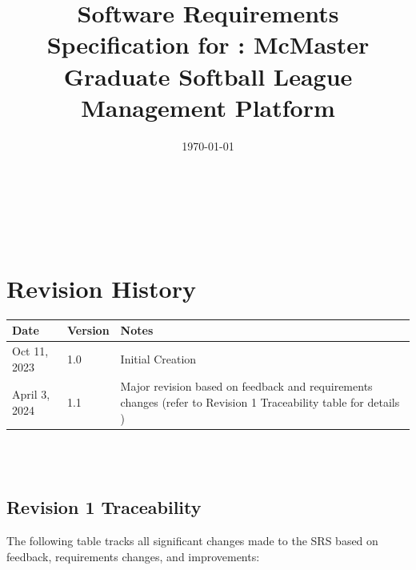 \documentclass[12pt, titlepage]{article}
\begin{document}
\title{Software Requirements Specification for \progname: McMaster Graduate Softball League Management Platform} 
\author{\authname}
\date{\today}
	
\maketitle

~\newpage


\tableofcontents

\listoftables

~\newpage

\section*{Revision History}

\begin{tabularx}{\textwidth}{p{3cm}p{2cm}X}
\toprule {\textbf{Date}} & {\textbf{Version}} & {\textbf{Notes}}\\
\midrule
Oct 11, 2023 & 1.0 & Initial Creation \\
April 3, 2024 & 1.1 & Major revision based on feedback and requirements changes (refer to Revision 1 Traceability table for details )\\
\bottomrule
\end{tabularx}

~\\

~\newpage

\subsection{Revision 1 Traceability}
The following table tracks all significant changes made to the SRS based on feedback, requirements changes, and improvements:
\end{document}
